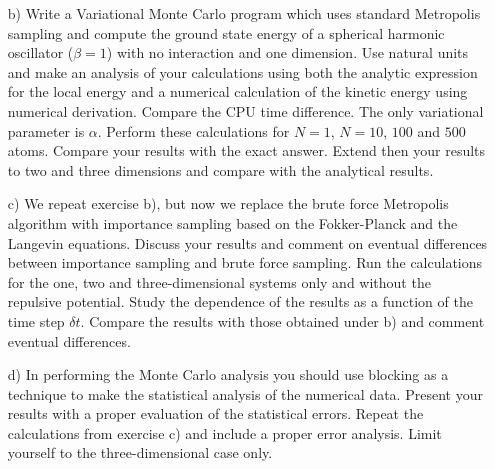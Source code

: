 \documentclass[10pt]{article}
\begin{document}
\begin{enumerate}
 \item[b)] Write a Variational Monte Carlo program which uses standard
   Metropolis sampling and compute the ground state energy of a
   spherical harmonic oscillator ($\beta = 1$) with no interaction and
   one dimension.  Use natural units and make an analysis of your
   calculations using both the analytic expression for the local
   energy and a numerical calculation of the kinetic energy using
   numerical derivation.  Compare the CPU time difference.  The only
   variational parameter is $\alpha$. Perform these calculations for
   $N=1$, $N=10$, $100$ and $500$ atoms. Compare your results with the
   exact answer.  Extend then your results to two and three dimensions
   and compare with the analytical results.

\item[c)] We repeat exercise b), but now we replace the brute force Metropolis algorithm with 
importance sampling based on the Fokker-Planck and the Langevin equations. 
Discuss your results and comment on eventual differences between importance sampling and brute force sampling.
Run the calculations for the one, two and three-dimensional systems only and without the repulsive potential. 
Study the dependence of the results as a function of the time step $\delta t$.  
Compare the results with those obtained under b) and comment eventual differences.

\item[d)] In performing the Monte Carlo analysis you should use
  blocking as a technique to make the statistical analysis of the
  numerical data. Present your results with a proper evaluation of the
  statistical errors. Repeat the calculations from exercise c) and
  include a proper error analysis. Limit yourself to the
  three-dimensional case only.


\end{enumerate}
\end{document}

